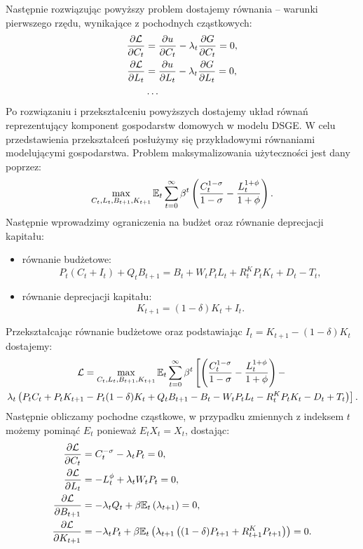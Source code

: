 Następnie rozwiązując powyższy problem dostajemy równania -- warunki pierwszego rzędu, wynikające z pochodnych cząstkowych:
\begin{align}
    \frac{\partial \mathcal{L}}{\partial C_t} &= \frac{\partial u}{\partial C_t} - \lambda_t \frac{\partial G}{\partial C_t} = 0,\\
    \frac{\partial \mathcal{L}}{\partial L_t} &= \frac{\partial u}{\partial L_t} - \lambda_t \frac{\partial G}{\partial L_t} = 0,\\
    &\notag\dots
\end{align}
Po rozwiązaniu i przekształceniu powyższych dostajemy układ równań reprezentujący komponent gospodarstw domowych w modelu DSGE. W celu przedstawienia przekształceń posłużymy się przykładowymi równaniami modelującymi gospodarstwa. Problem maksymalizowania użyteczności jest dany poprzez:
\begin{equation}
    \max_{C_t, L_t, B_{t+1}, K_{t+1}} \mathbb{E}_t\sum_{t=0}^{\infty}\beta^t\left(\frac{C_t^{1-\sigma}}{1-\sigma} - \frac{L_t^{1+\phi}}{1+\phi}\right).
\end{equation}
Następnie wprowadzimy ograniczenia na budżet oraz równanie deprecjacji kapitału:
\begin{itemize}
    \item równanie budżetowe:
        \begin{equation}
            P_t(C_t + I_t) + Q_t B_{t+1} = B_{t} + W_t P_t L_t + R^K_t P_t K_t + D_t - T_t,
        \end{equation}
    \item równanie deprecjacji kapitału:
        \begin{equation}
            K_{t+1} = (1-\delta)K_t + I_t.
        \end{equation}
\end{itemize}
Przekształcając równanie budżetowe oraz podstawiając $I_t = K_{t+1} - (1-\delta)K_t$ dostajemy:
\begin{multline}
    \mathcal{L} = \max_{C_t, L_t, B_{t+1}, K_{t+1}} \mathbb{E}_t\sum_{t=0}^{\infty}\beta^t\left[\left(\frac{C_t^{1-\sigma}}{1-\sigma} - \frac{L_t^{1+\phi}}{1+\phi}\right) - \right. \\ \left. \lambda_t\left(P_t C_t + P_t K_{t+1} - P_t (1-\delta) K_t + Q_t B_{t+1} - B_t - W_t P_t L_t - R^K_t P_t K_t - D_t + T_t\right)\right].
\end{multline}
Następnie  obliczamy pochodne cząstkowe, w przypadku zmiennych z indeksem $t$ możemy pominąć $E_t$ ponieważ $E_t X_t = X_t$,  dostając:
\begin{align}
    \frac{\partial \mathcal{L}}{\partial C_t} &= C_t^{-\sigma} - \lambda_t P_t = 0,\\
    \frac{\partial \mathcal{L}}{\partial L_t} &= -L_t^{\phi} + \lambda_t W_t P_t = 0,\\
    \label{eqn:euler_B}\frac{\partial \mathcal{L}}{\partial B_{t+1}} &= -\lambda_t Q_t + \beta \mathbb{E}_t \left( \lambda_{t+1}\right) = 0,\\
    \label{eqn:euler_K}\frac{\partial \mathcal{L}}{\partial K_{t+1}} &= -\lambda_t P_t + \beta \mathbb{E}_t \left( \lambda_{t+1} \left((1-\delta)P_{t+1} + R^K_{t+1} P_{t+1}\right)\right) = 0.\\
\end{align}
